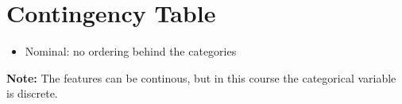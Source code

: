 \section{Contingency Table}
\begin{itemize}
  \item Nominal: no ordering behind the categories
\end{itemize}
\par\bigskip
\noindent\textbf{Note:} The features can be continous, but in this course the categorical variable is discrete.
